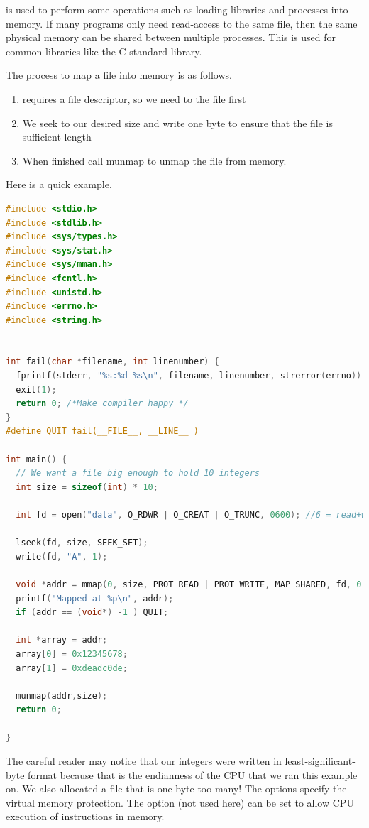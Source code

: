  is used to perform some operations such as loading libraries and processes into memory.
If many programs only need read-access to the same file, then the same physical memory can be shared between multiple processes.
This is used for common libraries like the C standard library.

The process to map a file into memory is as follows.

\begin{enumerate}
\item {} requires a file descriptor, so we need to  the file first
\item We seek to our desired size and write one byte to ensure that the file is sufficient length
\item When finished call munmap to unmap the file from memory.
\end{enumerate}

Here is a quick example.

\begin{lstlisting}[language=C]
#include <stdio.h>
#include <stdlib.h>
#include <sys/types.h>
#include <sys/stat.h>
#include <sys/mman.h>
#include <fcntl.h>
#include <unistd.h>
#include <errno.h>
#include <string.h>


int fail(char *filename, int linenumber) {
  fprintf(stderr, "%s:%d %s\n", filename, linenumber, strerror(errno));
  exit(1);
  return 0; /*Make compiler happy */
}
#define QUIT fail(__FILE__, __LINE__ )

int main() {
  // We want a file big enough to hold 10 integers
  int size = sizeof(int) * 10;

  int fd = open("data", O_RDWR | O_CREAT | O_TRUNC, 0600); //6 = read+write for me!

  lseek(fd, size, SEEK_SET);
  write(fd, "A", 1);

  void *addr = mmap(0, size, PROT_READ | PROT_WRITE, MAP_SHARED, fd, 0);
  printf("Mapped at %p\n", addr);
  if (addr == (void*) -1 ) QUIT;

  int *array = addr;
  array[0] = 0x12345678;
  array[1] = 0xdeadc0de;

  munmap(addr,size);
  return 0;

}
\end{lstlisting}

The careful reader may notice that our integers were written in least-significant-byte format because that is the endianness of the CPU that we ran this example on.
We also allocated a file that is one byte too many! The  options specify the virtual memory protection.
The option  (not used here) can be set to allow CPU execution of instructions in memory.

